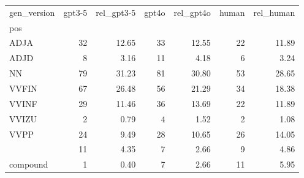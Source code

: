 \begin{tabular}{lrrrrrr}
\toprule
gen_version & gpt3-5 & rel_gpt3-5 & gpt4o & rel_gpt4o & human & rel_human \\
pos &  &  &  &  &  &  \\
\midrule
ADJA & 32 & 12.65 & 33 & 12.55 & 22 & 11.89 \\
ADJD & 8 & 3.16 & 11 & 4.18 & 6 & 3.24 \\
NN & 79 & 31.23 & 81 & 30.80 & 53 & 28.65 \\
VVFIN & 67 & 26.48 & 56 & 21.29 & 34 & 18.38 \\
VVINF & 29 & 11.46 & 36 & 13.69 & 22 & 11.89 \\
VVIZU & 2 & 0.79 & 4 & 1.52 & 2 & 1.08 \\
VVPP & 24 & 9.49 & 28 & 10.65 & 26 & 14.05 \\
[VVFIN, PTKVZ] & 11 & 4.35 & 7 & 2.66 & 9 & 4.86 \\
compound & 1 & 0.40 & 7 & 2.66 & 11 & 5.95 \\
\bottomrule
\end{tabular}
